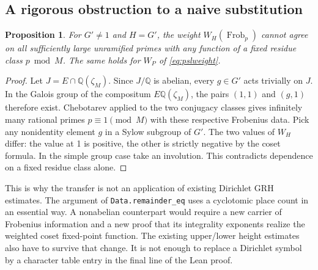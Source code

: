 \documentclass[11pt]{article}
\newtheorem{proposition}[theorem]{Proposition}
\theoremstyle{remark}\newtheorem{remark}[theorem]{Remark}
\newcommand{\Q}{\mathbb Q}
\newcommand{\Frob}{\operatorname{Frob}}
\begin{document}
\subsection{A rigorous obstruction to a naive substitution}
\begin{proposition}\label{prop:obstruction}
For $G'\ne1$ and $H=G'$, the weight $W_H(\Frob_p)$ cannot agree on all sufficiently large unramified primes with any function of a fixed residue class $p\bmod M$. The same holds for $W_P$ of \eqref{eq:pslweight}.
\end{proposition}
\begin{proof}
Let $J=E\cap\Q(\zeta_M)$. Since $J/\Q$ is abelian, every $g\in G'$ acts trivially on $J$. In the Galois group of the compositum $E\Q(\zeta_M)$, the pairs $(1,1)$ and $(g,1)$ therefore exist. Chebotarev applied to the two conjugacy classes gives infinitely many rational primes $p\equiv1\pmod M$ with these respective Frobenius data. Pick any nonidentity element $g$ in a Sylow subgroup of $G'$. The two values of $W_H$ differ: the value at 1 is positive, the other is strictly negative by the coset formula. In the simple group case take an involution. This contradicts dependence on a fixed residue class alone.
\end{proof}
This is why the transfer is not an application of existing Dirichlet GRH estimates. The argument of \texttt{Data.remainder\_eq} uses a cyclotomic place count in an essential way. A nonabelian counterpart would require a new carrier of Frobenius information and a new proof that its integrality exponents realize the weighted coset fixed-point function. The existing upper/lower height estimates also have to survive that change. It is not enough to replace a Dirichlet symbol by a character table entry in the final line of the Lean proof.
\end{document}
